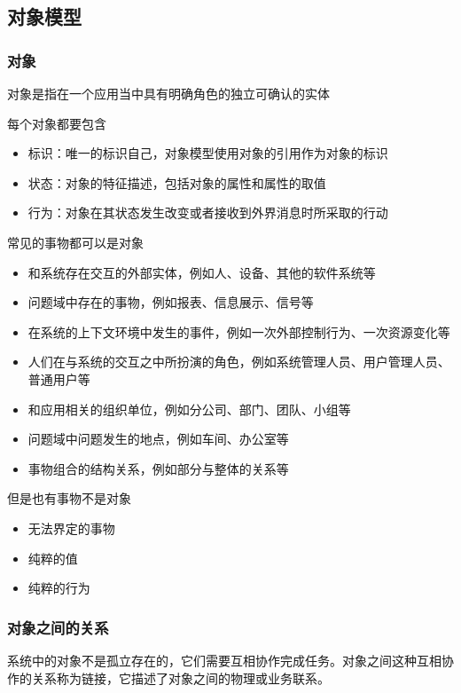 \subsection{对象模型}

\subsubsection{对象}
对象是指在一个应用当中具有明确角色的独立可确认的实体 

每个对象都要包含
\begin{itemize}
    \item 标识：唯一的标识自己，对象模型使用对象的引用作为对象的标识
    \item 状态：对象的特征描述，包括对象的属性和属性的取值 
    \item 行为：对象在其状态发生改变或者接收到外界消息时所采取的行动 
\end{itemize}

常见的事物都可以是对象
\begin{itemize}
    \item 和系统存在交互的外部实体，例如人、设备、其他的软件系统等
    \item 问题域中存在的事物，例如报表、信息展示、信号等
    \item 在系统的上下文环境中发生的事件，例如一次外部控制行为、一次资源变化等
    \item 人们在与系统的交互之中所扮演的角色，例如系统管理人员、用户管理人员、普通用户等
    \item 和应用相关的组织单位，例如分公司、部门、团队、小组等
    \item 问题域中问题发生的地点，例如车间、办公室等
    \item 事物组合的结构关系，例如部分与整体的关系等
\end{itemize}

但是也有事物不是对象
\vspace{-0.8em}
\begin{multicols}{3}
    \begin{itemize}
        \item 无法界定的事物
        \item 纯粹的值
        \item 纯粹的行为
    \end{itemize}
\end{multicols}
\vspace{-1.2em}

\subsubsection{对象之间的关系}
系统中的对象不是孤立存在的，它们需要互相协作完成任务。对象之间这种互相协作的关系称为链接，它描述了对象之间的物理或业务联系。

